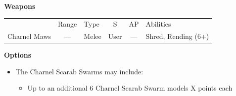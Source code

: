 \begin{minipage}[t]{0.72\textwidth}
	\vspace*{2em}
	\textbf{Weapons}
	
	\begin{tabular}{L{90 pt} c C{40pt} *{2}{c} >{\raggedright\arraybackslash}p{130pt}}
		& Range & Type & S & AP & Abilities \\
		Charnel Maws & — & Melee & User & — & Shred, Rending (6+) \\
	\end{tabular}
		
	\vspace*{2em}
	\textbf{Options}
	\begin{itemize}
		\item The Charnel Scarab Swarms may include:
		\begin{itemize}
			\item Up to an additional 6 Charnel Scarab Swarm models \dotfill X points each
		\end{itemize}
	\end{itemize}
\end{minipage}


\newpage
\subsubsection[Triarch Praetorian Vanguard]{}

